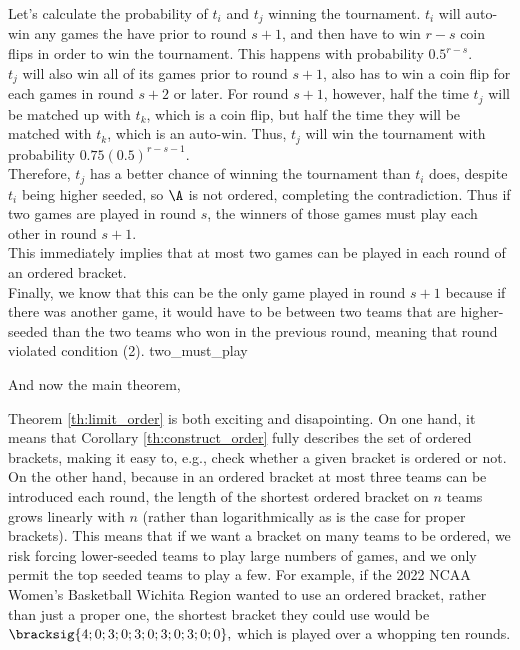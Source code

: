 {{    Let's calculate the probability of $t_i$ and $t_j$ winning the tournament. $t_i$ will auto-win any games the have prior to round $s+1$, and then have to win $r - s$ coin flips in order to win the tournament. This happens with probability $0.5^{r-s}.$\\

    $t_j$ will also win all of its games prior to round $s+1$, also has to win a coin flip for each games in round $s+2$ or later. For round $s+1$, however, half the time $t_j$ will be matched up with $t_k$, which is a coin flip, but half the time they will be matched with $t_k$, which is an auto-win. Thus, $t_j$ will win the tournament with probability $0.75(0.5)^{r-s-1}.$\\

    Therefore, $t_j$ has a better chance of winning the tournament than $t_i$ does, despite $t_i$ being higher seeded, so $\A$ is not ordered, completing the contradiction. Thus if two games are played in round $s$, the winners of those games must play each other in round $s+1.$\\

    This immediately implies that at most two games can be played in each round of an ordered bracket.\\
    
    Finally, we know that this can be the only game played in round $s+1$ because if there was another game, it would have to be between two teams that are higher-seeded than the two teams who won in the previous round, meaning that round violated condition (2).
}{two_must_play}

And now the main theorem,


Theorem \ref{th:limit_order} is both exciting and disapointing. On one hand, it means that Corollary \ref{th:construct_order} fully describes the set of ordered brackets, making it easy to, e.g., check whether a given bracket is ordered or not. On the other hand, because in an ordered bracket at most three teams can be introduced each round, the length of the shortest ordered bracket on $n$ teams grows linearly with $n$ (rather than logarithmically as is the case for proper brackets). This means that if we want a bracket on many teams to be ordered, we risk forcing lower-seeded teams to play large numbers of games, and we only permit the top seeded teams to play a few. For example, if the 2022 NCAA Women's Basketball Wichita Region wanted to use an ordered bracket, rather than just a proper one, the shortest bracket they could use would be $\bracksig{4; 0; 3; 0; 3; 0; 3; 0; 3; 0; 0},$ which is played over a whopping ten rounds.

}
